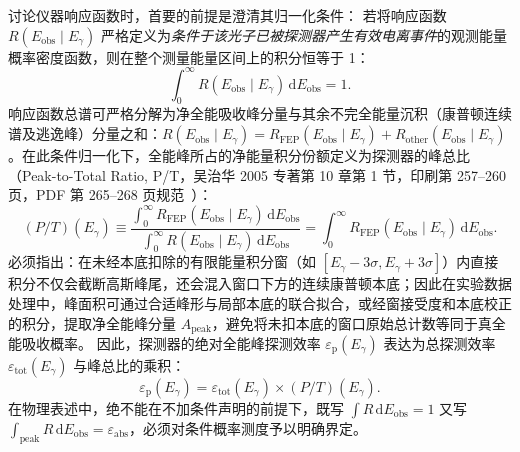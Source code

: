 讨论仪器响应函数时，首要的前提是澄清其归一化条件：
若将响应函数 $R(E_{\mathrm{obs}} \mid E_\gamma)$ 严格定义为\emph{条件于该光子已被探测器产生有效电离事件}的观测能量概率密度函数，则在整个测量能量区间上的积分恒等于 1：
\begin{equation}\label{eq:5-2-norm-cond}
\int_0^\infty R(E_{\mathrm{obs}} \mid E_\gamma) \, \mathrm{d}E_{\mathrm{obs}} = 1.
\end{equation}
响应函数总谱可严格分解为净全能吸收峰分量与其余不完全能量沉积（康普顿连续谱及逃逸峰）分量之和：$R(E_{\mathrm{obs}} \mid E_\gamma) = R_{\mathrm{FEP}}(E_{\mathrm{obs}} \mid E_\gamma) + R_{\mathrm{other}}(E_{\mathrm{obs}} \mid E_\gamma)$。在此条件归一化下，全能峰所占的净能量积分份额定义为探测器的峰总比（Peak-to-Total Ratio, P/T，吴治华 2005 专著第 10 章第 1 节，印刷第 257–260 页，PDF 第 265–268 页规范~\cite{book-wu-nuclear-experiment-methods}）：
\begin{equation}\label{eq:5-2-peak-to-total}
(P/T)(E_\gamma) \equiv \frac{\int_0^\infty R_{\mathrm{FEP}}(E_{\mathrm{obs}} \mid E_\gamma) \, \mathrm{d}E_{\mathrm{obs}}}{\int_0^\infty R(E_{\mathrm{obs}} \mid E_\gamma) \, \mathrm{d}E_{\mathrm{obs}}} = \int_0^\infty R_{\mathrm{FEP}}(E_{\mathrm{obs}} \mid E_\gamma) \, \mathrm{d}E_{\mathrm{obs}}.
\end{equation}
必须指出：在未经本底扣除的有限能量积分窗（如 $[E_\gamma - 3\sigma, E_\gamma + 3\sigma]$）内直接积分不仅会截断高斯峰尾，还会混入窗口下方的连续康普顿本底；因此在实验数据处理中，峰面积可通过合适峰形与局部本底的联合拟合，或经窗接受度和本底校正的积分，提取净全能峰分量 $A_{\mathrm{peak}}$，避免将未扣本底的窗口原始总计数等同于真全能吸收概率。
因此，探测器的绝对全能峰探测效率 $\varepsilon_{\mathrm{p}}(E_\gamma)$ 表达为总探测效率 $\varepsilon_{\mathrm{tot}}(E_\gamma)$ 与峰总比的乘积：
\begin{equation}\label{eq:5-2-eff-decomp}
\varepsilon_{\mathrm{p}}(E_\gamma) = \varepsilon_{\mathrm{tot}}(E_\gamma) \times (P/T)(E_\gamma).
\end{equation}
在物理表述中，绝不能在不加条件声明的前提下，既写 $\int R \, \mathrm{d}E_{\mathrm{obs}} = 1$ 又写 $\int_{\mathrm{peak}} R \, \mathrm{d}E_{\mathrm{obs}} = \varepsilon_{\mathrm{abs}}$，必须对条件概率测度予以明确界定。

